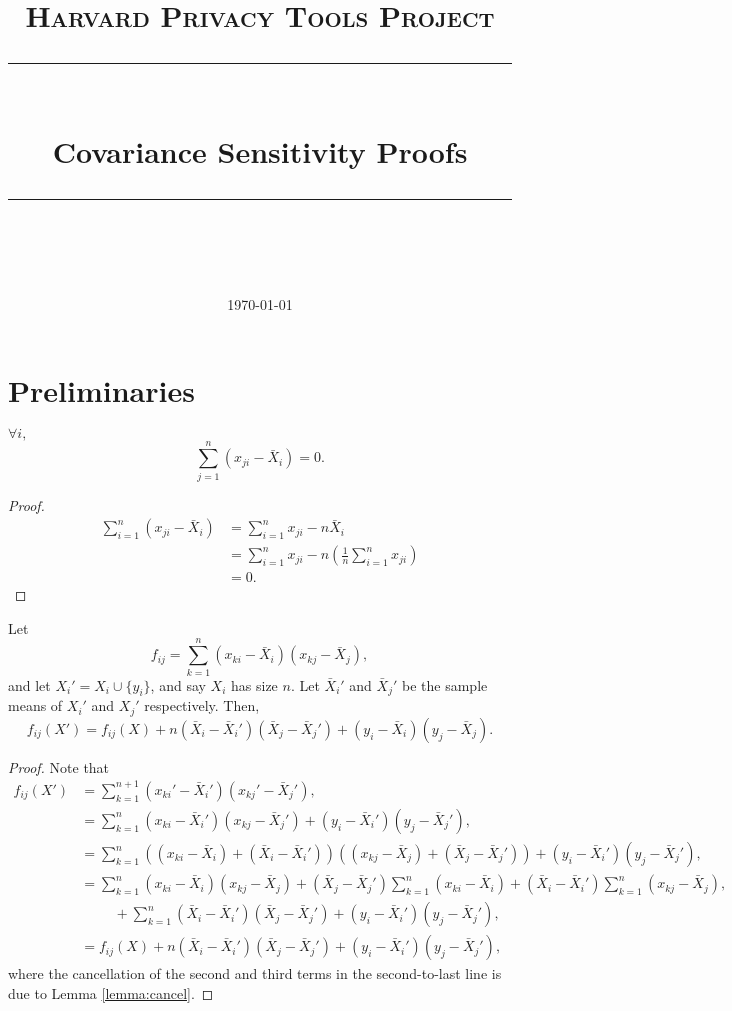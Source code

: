 \documentclass[11pt]{scrartcl} %
\title{
	\normalfont\normalsize
	\textsc{Harvard Privacy Tools Project}\\ %
	\vspace{25pt} %
	\rule{\linewidth}{0.5pt}\\ %
	\vspace{20pt} %
	{\huge Covariance Sensitivity Proofs}\\ %
	\vspace{12pt} %
	\rule{\linewidth}{2pt}\\ %
	\vspace{12pt} %
}
\date{\normalsize\today} %
\begin{document}
\maketitle

\section{Preliminaries}

\begin{lemma}
\label{lemma:cancel}
$\forall i,$
$$ \sum_{j=1}^n (x_{ji} - \bar{X}_i) = 0.$$
\end{lemma}

\begin{proof}
\begin{align*}
\sum_{i=1}^n (x_{ji} - \bar{X}_i) &= \sum_{i=1}^n x_{ji} - n \bar{X}_i\\
	&= \sum_{i=1}^n x_{ji} - n\left( \frac{1}{n}\sum_{i=1}^n x_{ji}\right) \\
	&= 0.
\end{align*}
\end{proof}

\begin{lemma}
\label{cov:rewrite}
Let 
$$ f_{ij} = \sum_{k=1}^n (x_{ki} - \bar{X}_i)(x_{kj} - \bar{X}_j),$$
and let $X_i' = X_i \cup \{y_i\}$, and say $X_i$ has size $n$. Let $\bar{X}_i'$ and $\bar{X}_j'$ be the sample means of $X_i'$ and $X_j'$ respectively. Then,
$$ f_{ij}(X') = f_{ij}(X) + n(\bar{X}_i - \bar{X}_i')(\bar{X}_j - \bar{X}_j') + (y_i - \bar{X}_i)(y_j - \bar{X}_j).$$
\end{lemma}

\begin{proof}
Note that
\begin{align*}
f_{ij}(X') &= \sum_{k=1}^{n+1} (x_{ki}' - \bar{X}_i')(x_{kj}' - \bar{X}_j'),\\
	&= \sum_{k=1}^{n} (x_{ki} - \bar{X}_i')(x_{kj} - \bar{X}_j') + (y_i - \bar{X}_i')(y_j - \bar{X}_j'),\\
	&= \sum_{k=1}^{n} \left( (x_{ki} - \bar{X}_i )+ (\bar{X}_i - \bar{X}_i' )\right) \left( (x_{kj} - \bar{X}_j )+ (\bar{X}_j - \bar{X}_j') \right) + (y_i - \bar{X}_i')(y_j - \bar{X}_j'),\\
	&= \sum_{k=1}^{n} (x_{ki} - \bar{X}_i)(x_{kj} - \bar{X}_j) + (\bar{X}_j - \bar{X}_j')\sum_{k=1}^{n} (x_{ki}-\bar{X}_i) + (\bar{X}_i - \bar{X}_i') \sum_{k=1}^{n} (x_{kj} - \bar{X}_j),\\
	& \hspace{1cm} + \sum_{k=1}^{n} (\bar{X}_i - \bar{X}_i')(\bar{X}_j - \bar{X}_j') + (y_i - \bar{X}_i')(y_j - \bar{X}_j'),\\
	&= f_{ij}(X) + n(\bar{X}_i - \bar{X}_i')(\bar{X}_j - \bar{X}_j') + (y_i - \bar{X}_i')(y_j - \bar{X}_j'),
\end{align*}
where the cancellation of the second and third terms in the second-to-last line is due to Lemma \ref{lemma:cancel}.
\end{proof}
\end{document}
